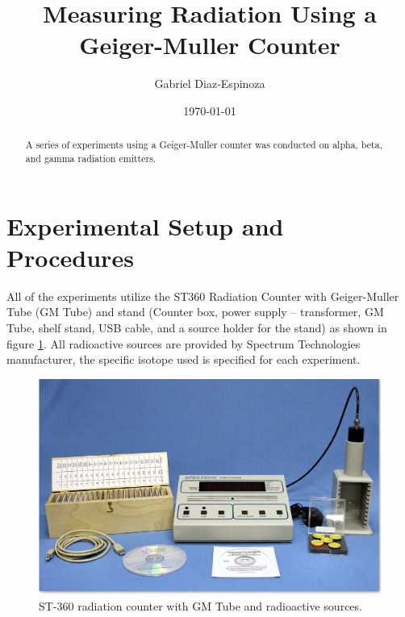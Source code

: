 \documentclass[reprint,amsmath,amssymb,aps,prl]{revtex4-2}
\begin{document}
\title{Measuring Radiation Using a Geiger-Muller Counter}

\author{Gabriel Diaz-Espinoza}

%

\date{\today}%

\begin{abstract}
A series of experiments using a Geiger-Muller counter was conducted on alpha, beta, and gamma radiation emitters. 
\end{abstract}

\maketitle

\section{Experimental Setup and Procedures}
All of the experiments utilize the ST360 Radiation Counter with Geiger-Muller Tube (GM Tube) and stand (Counter box, power supply – transformer, GM Tube, shelf stand, USB cable, and a source holder for the stand) as shown in figure \ref{fig:st360_setup}. All radioactive sources are provided by Spectrum Technologies manufacturer, the specific isotope used is specified for each experiment. 
\begin{figure}
    \centering
    \includegraphics[scale = 0.2]{ST360_setup.png}
    \caption{ST-360 radiation counter with GM Tube and radioactive sources.}
    \label{fig:st360_setup}
\end{figure}
\end{document}
